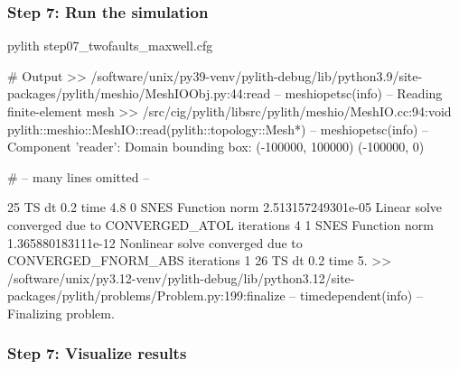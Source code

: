 \documentclass[aspectratio=169]{beamer}
\begin{document}
\begin{frame}[fragile]
  \frametitle{Step 7: Run the simulation}
  \summary{}

\begin{bashcode}
pylith step07_twofaults_maxwell.cfg

# Output
 >> /software/unix/py39-venv/pylith-debug/lib/python3.9/site-packages/pylith/meshio/MeshIOObj.py:44:read
 -- meshiopetsc(info)
 -- Reading finite-element mesh
 >> /src/cig/pylith/libsrc/pylith/meshio/MeshIO.cc:94:void pylith::meshio::MeshIO::read(pylith::topology::Mesh*)
 -- meshiopetsc(info)
 -- Component 'reader': Domain bounding box:
    (-100000, 100000)
    (-100000, 0)

# -- many lines omitted --

25 TS dt 0.2 time 4.8
    0 SNES Function norm 2.513157249301e-05
      Linear solve converged due to CONVERGED_ATOL iterations 4
    1 SNES Function norm 1.365880183111e-12
    Nonlinear solve converged due to CONVERGED_FNORM_ABS iterations 1
26 TS dt 0.2 time 5.
 >> /software/unix/py3.12-venv/pylith-debug/lib/python3.12/site-packages/pylith/problems/Problem.py:199:finalize
 -- timedependent(info)
 -- Finalizing problem.
\end{bashcode}
  
\end{frame}


\begin{frame}
  \frametitle{Step 7: Visualize results}

    
\end{frame}



\end{document}
